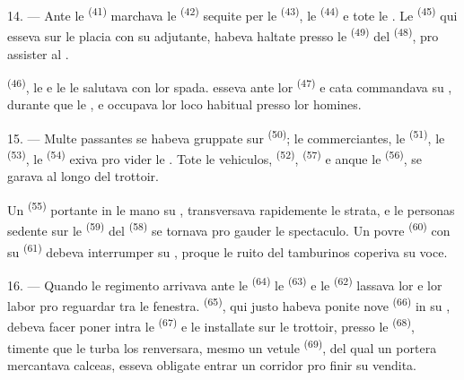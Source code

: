 \VUsaut{3.0mm}

14. --- Ante le  \textsuperscript{(41)} marchava le
 \textsuperscript{(42)} sequite per le 
\textsuperscript{(43)}, le  \textsuperscript{(44)} e tote le
. Le  \textsuperscript{(45)} qui esseva
sur le placia con su adjutante, habeva haltate presso le 
\textsuperscript{(49)} del  \textsuperscript{(48)}, pro assister
al .

 \textsuperscript{(46)}, le
 e le  le salutava con lor spada.
 esseva ante lor 
\textsuperscript{(47)} e cata  commandava su ,
durante que le ,  e
 occupava lor loco habitual presso lor homines.

15. --- Multe passantes se habeva gruppate sur 
\textsuperscript{(50)}; le commerciantes, le 
\textsuperscript{(51)}, le  \textsuperscript{(53)}, le
 \textsuperscript{(54)} exiva pro vider le .
Tote le vehiculos,  \textsuperscript{(52)},  \textsuperscript{(57)} e anque le 
\textsuperscript{(56)}, se garava al longo del trottoir.

\VUsaut{3.0mm}

Un  \textsuperscript{(55)} portante in le mano su
, transversava rapidemente le strata, e le personas
sedente sur le  \textsuperscript{(59)} del 
\textsuperscript{(58)} se tornava pro gauder le spectaculo. Un povre
 \textsuperscript{(60)} con su  \textsuperscript{(61)} debeva interrumper su , proque le
ruito del tamburinos coperiva su voce.

16. --- Quando le regimento arrivava ante le 
\textsuperscript{(64)} le  \textsuperscript{(63)} e le
 \textsuperscript{(62)} lassava lor  e
lor labor pro reguardar tra le fenestra. 
\textsuperscript{(65)}, qui justo habeva ponite nove 
\textsuperscript{(66)} in su , debeva facer poner intra le
 \textsuperscript{(67)} e le  installate sur le
trottoir, presso le  \textsuperscript{(68)}, timente
que le turba los renversara, mesmo un vetule 
\textsuperscript{(69)}, del qual un portera mercantava calceas, esseva obligate
entrar un corridor pro finir su vendita.

